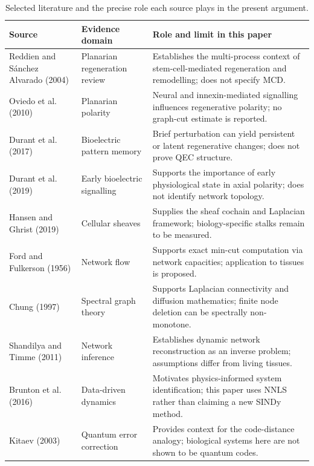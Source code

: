 \documentclass[12pt,a4paper]{article}
\begin{document}
\begin{table}[H]
\centering\small
\caption{Selected literature and the precise role each source plays in the present argument.}
\begin{tabularx}{\textwidth}{p{}p{}X}
\toprule
Source & Evidence domain & Role and limit in this paper\\
\midrule
Reddien and S\'anchez Alvarado (2004) & Planarian regeneration review & Establishes the multi-process context of stem-cell-mediated regeneration and remodelling; does not specify MCD.\\
Oviedo et al. (2010) & Planarian polarity & Neural and innexin-mediated signalling influences regenerative polarity; no graph-cut estimate is reported.\\
Durant et al. (2017) & Bioelectric pattern memory & Brief perturbation can yield persistent or latent regenerative changes; does not prove QEC structure.\\
Durant et al. (2019) & Early bioelectric signalling & Supports the importance of early physiological state in axial polarity; does not identify network topology.\\
Hansen and Ghrist (2019) & Cellular sheaves & Supplies the sheaf cochain and Laplacian framework; biology-specific stalks remain to be measured.\\
Ford and Fulkerson (1956) & Network flow & Supports exact min-cut computation via network capacities; application to tissues is proposed.\\
Chung (1997) & Spectral graph theory & Supports Laplacian connectivity and diffusion mathematics; finite node deletion can be spectrally non-monotone.\\
Shandilya and Timme (2011) & Network inference & Establishes dynamic network reconstruction as an inverse problem; assumptions differ from living tissues.\\
Brunton et al. (2016) & Data-driven dynamics & Motivates physics-informed system identification; this paper uses NNLS rather than claiming a new SINDy method.\\
Kitaev (2003) & Quantum error correction & Provides context for the code-distance analogy; biological systems here are not shown to be quantum codes.\\
\bottomrule
\end{tabularx}
\end{table}
\end{document}
